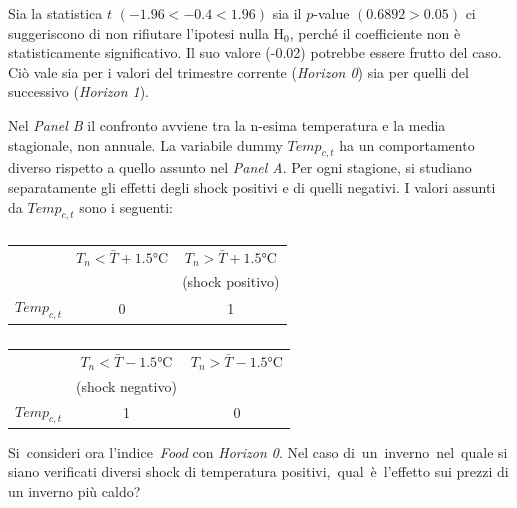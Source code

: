 Sia la statistica $t$ $(-1.96<-0.4<1.96)$ sia il $p$-value $(0.6892>0.05)$ ci suggeriscono di non rifiutare l'ipotesi nulla H$_0$, perché il coefficiente non è statisticamente significativo. Il suo valore (-0.02) potrebbe essere frutto del caso. Ciò vale sia per i valori del trimestre corrente (\textit{Horizon 0}) sia per quelli del successivo (\textit{Horizon 1}).

Nel \textit{Panel B} il confronto avviene tra la n-esima temperatura e la media stagionale, non annuale. La variabile dummy $Temp_{c,t}$ ha un comportamento diverso rispetto a quello assunto nel \textit{Panel A}. Per ogni stagione, si studiano separatamente gli effetti degli shock positivi e di quelli negativi. I valori assunti da $Temp_{c,t}$ sono i seguenti:

\begin{table}[h]
	\centering
	\begin{tabular}{l|c|c}
		\toprule
		& $T_n < \bar{T}+1.5$°C & $T_n > \bar{T}+1.5$°C \\
		& & (shock positivo) \\
		\midrule
		$Temp_{c,t}$ & 0 & 1 \\
		\bottomrule
	\end{tabular}

	\vspace{0.5em}

	\begin{tabular}{l|c|c}
		\toprule
		& $T_n < \bar{T}-1.5$°C & $T_n > \bar{T}-1.5$°C \\
		& (shock negativo) & \\
		\midrule
		$Temp_{c,t}$ & 1 & 0 \\
		\bottomrule
	\end{tabular}
	\caption{}
	\label{tables:temp_dummy}
\end{table}

Si~consideri ora l'indice~\textit{Food} con \textit{Horizon 0}. Nel caso di~un~inverno~nel~quale si siano verificati diversi shock di temperatura positivi,~qual~è~l'effetto sui prezzi di un inverno più caldo?

\vspace{-1.5em}

